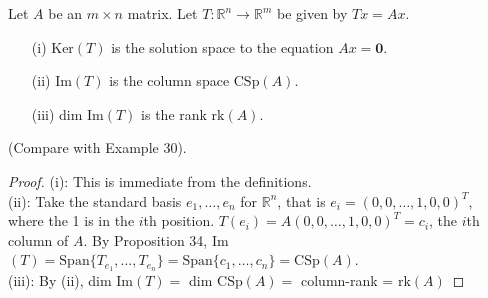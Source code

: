  
\begin{proposition}  Let $A$ be an $m \times n$ matrix. Let $T: \mathbb{R}^n \to \mathbb{R}^m$ be given by $Tx = Ax$. \begin{enumerate}
 \item[(i)] Ker$(T)$ is the solution space to the equation $Ax = \mathbf{0}$. 
 \item[(ii)] Im$(T)$ is the column space $\text{CSp}(A)$.
 \item[(iii)] dim Im$(T)$ is the rank $\text{rk}(A)$.
 \end{enumerate}
 
 (Compare with Example 30).
  \end{proposition}

 
 \begin{proof}
 (i): This is immediate from the definitions. \\
 
 (ii): Take the standard basis $e_1,\dots,e_n$ for $\mathbb{R}^n$, that is $e_i = (0,0,\dots,1,0,0)^T$, where the 1 is in the $i$th position. $T(e_i) = A(0,0,\dots,1,0,0)^T = c_i$, the $i$th column of $A$. By Proposition 34, Im$(T) = \text{Span}\{T_{e_1},\dots,T_{e_n}\} = \text{Span}\{c_1,\dots,c_n\} = \text{CSp}(A)$.\\
 
 (iii): By (ii), dim Im$(T) = $ dim $\text{CSp}(A) =$ column-rank = $\text{rk}(A)$
 \end{proof}\vspace*{10pt}

